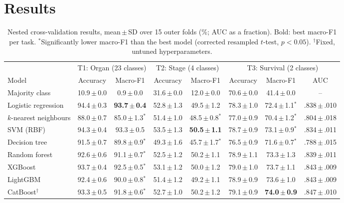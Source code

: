 \documentclass[conference]{IEEEtran}
\begin{document}
\section{Results}
\begin{table}[t]
\caption{Nested cross-validation results, mean\,$\pm$\,SD over 15 outer folds (\%; AUC as a fraction). Bold: best macro-F1 per task. $^{*}$Significantly lower macro-F1 than the best model (corrected resampled $t$-test, $p<0.05$). $^{\dagger}$Fixed, untuned hyperparameters.}
\label{tab:main}
\centering
\footnotesize
\setlength{\tabcolsep}{5pt}
\begin{tabular}{lccccccc}
\toprule
 & \multicolumn{2}{c}{T1: Organ (23 classes)} & \multicolumn{2}{c}{T2: Stage (4 classes)} & \multicolumn{3}{c}{T3: Survival (2 classes)} \\
\cmidrule(lr){2-3}\cmidrule(lr){4-5}\cmidrule(lr){6-8}
Model & Accuracy & Macro-F1 & Accuracy & Macro-F1 & Accuracy & Macro-F1 & AUC \\
\midrule
Majority class & 10.9\,$\pm$\,0.0 & 0.9\,$\pm$\,0.0 & 31.6\,$\pm$\,0.0 & 12.0\,$\pm$\,0.0 & 70.6\,$\pm$\,0.0 & 41.4\,$\pm$\,0.0 & -- \\
\midrule
Logistic regression & 94.4\,$\pm$\,0.3 & \textbf{93.7\,$\pm$\,0.4} & 52.8\,$\pm$\,1.3 & 49.5\,$\pm$\,1.2 & 78.3\,$\pm$\,1.0 & 72.4\,$\pm$\,1.1$^{*}$ & .838\,$\pm$\,.010 \\
$k$-nearest neighbours & 88.0\,$\pm$\,0.7 & 85.0\,$\pm$\,1.3$^{*}$ & 51.4\,$\pm$\,1.0 & 48.5\,$\pm$\,0.8$^{*}$ & 77.0\,$\pm$\,0.9 & 70.4\,$\pm$\,1.2$^{*}$ & .804\,$\pm$\,.018 \\
SVM (RBF) & 94.3\,$\pm$\,0.4 & 93.3\,$\pm$\,0.5 & 53.5\,$\pm$\,1.3 & \textbf{50.5\,$\pm$\,1.1} & 78.7\,$\pm$\,0.9 & 73.1\,$\pm$\,0.9$^{*}$ & .834\,$\pm$\,.011 \\
Decision tree & 91.5\,$\pm$\,0.7 & 89.8\,$\pm$\,0.9$^{*}$ & 49.3\,$\pm$\,1.6 & 45.7\,$\pm$\,1.7$^{*}$ & 76.5\,$\pm$\,0.9 & 71.6\,$\pm$\,0.7$^{*}$ & .788\,$\pm$\,.015 \\
Random forest & 92.6\,$\pm$\,0.6 & 91.1\,$\pm$\,0.7$^{*}$ & 52.5\,$\pm$\,1.2 & 50.2\,$\pm$\,1.1 & 78.9\,$\pm$\,1.1 & 73.3\,$\pm$\,1.3 & .839\,$\pm$\,.011 \\
XGBoost & 93.7\,$\pm$\,0.4 & 92.5\,$\pm$\,0.5$^{*}$ & 53.1\,$\pm$\,1.2 & 50.0\,$\pm$\,1.2 & 79.0\,$\pm$\,1.0 & 73.7\,$\pm$\,1.1 & .843\,$\pm$\,.009 \\
LightGBM & 92.4\,$\pm$\,0.6 & 90.0\,$\pm$\,0.8$^{*}$ & 51.4\,$\pm$\,1.2 & 49.2\,$\pm$\,1.1 & 78.9\,$\pm$\,0.9 & 73.6\,$\pm$\,1.0 & .843\,$\pm$\,.009 \\
CatBoost$^{\dagger}$ & 93.3\,$\pm$\,0.5 & 91.8\,$\pm$\,0.6$^{*}$ & 52.7\,$\pm$\,1.0 & 50.2\,$\pm$\,1.2 & 79.1\,$\pm$\,0.9 & \textbf{74.0\,$\pm$\,0.9} & .847\,$\pm$\,.010 \\
\bottomrule
\end{tabular}
\end{table}
\end{document}
